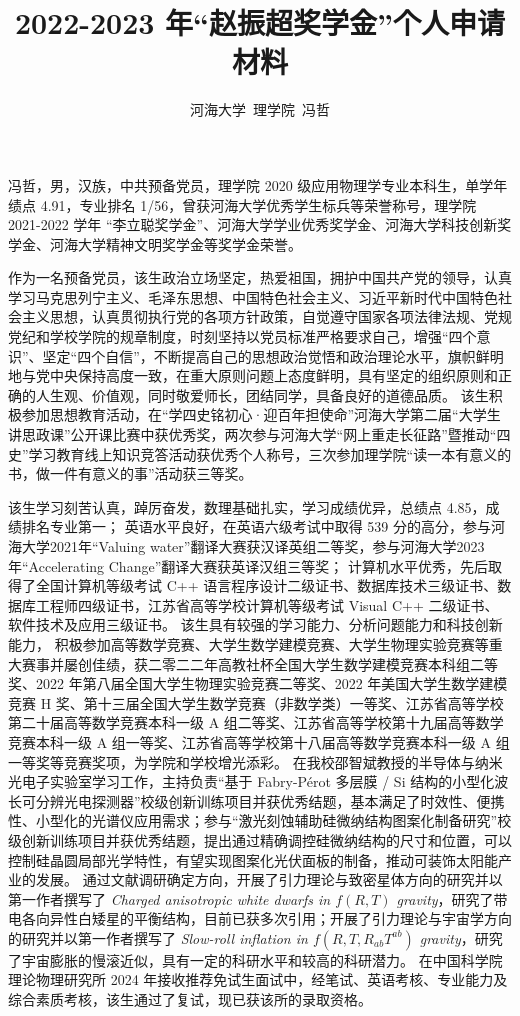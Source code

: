 \documentclass[12pt]{ctexart}
\title{2022-2023 年“赵振超奖学金”个人申请材料}
\author{河海大学\ 理学院\ 冯哲}
\begin{document}
\maketitle

冯哲，男，汉族，中共预备党员，理学院 2020 级应用物理学专业本科生，单学年绩点 4.91，专业排名 1/56，曾获河海大学优秀学生标兵等荣誉称号，理学院 2021-2022 学年 “李立聪奖学金”、河海大学学业优秀奖学金、河海大学科技创新奖学金、河海大学精神文明奖学金等奖学金荣誉。

作为一名预备党员，该生政治立场坚定，热爱祖国，拥护中国共产党的领导，认真学习马克思列宁主义、毛泽东思想、中国特色社会主义、习近平新时代中国特色社会主义思想，认真贯彻执行党的各项方针政策，自觉遵守国家各项法律法规、党规党纪和学校学院的规章制度，时刻坚持以党员标准严格要求自己，增强“四个意识”、坚定“四个自信”，不断提高自己的思想政治觉悟和政治理论水平，旗帜鲜明地与党中央保持高度一致，在重大原则问题上态度鲜明，具有坚定的组织原则和正确的人生观、价值观，同时敬爱师长，团结同学，具备良好的道德品质。
该生积极参加思想教育活动，在“学四史铭初心·迎百年担使命”河海大学第二届“大学生讲思政课”公开课比赛中获优秀奖，两次参与河海大学“网上重走长征路”暨推动“四史”学习教育线上知识竞答活动获优秀个人称号，三次参加理学院“读一本有意义的书，做一件有意义的事”活动获三等奖。

该生学习刻苦认真，踔厉奋发，数理基础扎实，学习成绩优异，总绩点 4.85，成绩排名专业第一；
英语水平良好，在英语六级考试中取得 539 分的高分，参与河海大学2021年“Valuing water”翻译大赛获汉译英组二等奖，参与河海大学2023年“Accelerating Change”翻译大赛获英译汉组三等奖；
计算机水平优秀，先后取得了全国计算机等级考试 C++ 语言程序设计二级证书、数据库技术三级证书、数据库工程师四级证书，江苏省高等学校计算机等级考试 Visual C++ 二级证书、软件技术及应用三级证书。
该生具有较强的学习能力、分析问题能力和科技创新能力，
积极参加高等数学竞赛、大学生数学建模竞赛、大学生物理实验竞赛等重大赛事并屡创佳绩，获二零二二年高教社杯全国大学生数学建模竞赛本科组二等奖、2022 年第八届全国大学生物理实验竞赛二等奖、2022 年美国大学生数学建模竞赛 H 奖、第十三届全国大学生数学竞赛（非数学类）一等奖、江苏省高等学校第二十届高等数学竞赛本科一级 A 组二等奖、江苏省高等学校第十九届高等数学竞赛本科一级 A 组一等奖、江苏省高等学校第十八届高等数学竞赛本科一级 A 组一等奖等竞赛奖项，为学院和学校增光添彩。
在我校邵智斌教授的半导体与纳米光电子实验室学习工作，主持负责“基于 Fabry-P{\'e}rot 多层膜 / Si 结构的小型化波长可分辨光电探测器”校级创新训练项目并获优秀结题，基本满足了时效性、便携性、小型化的光谱仪应用需求；参与“激光刻蚀辅助硅微纳结构图案化制备研究”校级创新训练项目并获优秀结题，提出通过精确调控硅微纳结构的尺寸和位置，可以控制硅晶圆局部光学特性，有望实现图案化光伏面板的制备，推动可装饰太阳能产业的发展。
通过文献调研确定方向，开展了引力理论与致密星体方向的研究并以第一作者撰写了 \textit{Charged anisotropic white dwarfs in $f\left(R, T\right)$ gravity}，研究了带电各向异性白矮星的平衡结构，目前已获多次引用；开展了引力理论与宇宙学方向的研究并以第一作者撰写了 \textit{Slow-roll inflation in $f\left(R, T, R_{ab}T^{ab}\right)$ gravity}，研究了宇宙膨胀的慢滚近似，具有一定的科研水平和较高的科研潜力。
在中国科学院理论物理研究所 2024 年接收推荐免试生面试中，经笔试、英语考核、专业能力及综合素质考核，该生通过了复试，现已获该所的录取资格。
\end{document}

